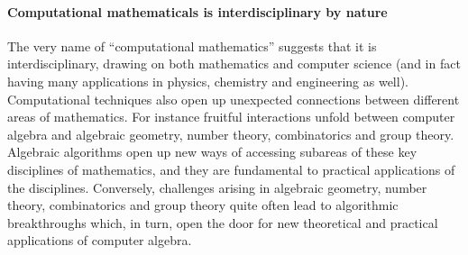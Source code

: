 

\paragraph{Computational mathematicals is interdisciplinary by nature}


The very name of ``computational mathematics'' suggests that it is
interdisciplinary, drawing on both mathematics and computer
science (and in fact having many applications in physics, chemistry
and engineering as well). Computational techniques also open up
unexpected connections between different areas of mathematics.
For instance fruitful interactions unfold between computer algebra and
algebraic geometry, number theory, combinatorics and group theory. Algebraic algorithms
open up new ways of accessing subareas of these key disciplines of
mathematics, and they are fundamental to practical applications of the
disciplines. Conversely, challenges arising in algebraic geometry, number
theory, combinatorics and group theory quite often lead to algorithmic breakthroughs
which, in turn, open the door for new theoretical and practical applications
of computer algebra.

